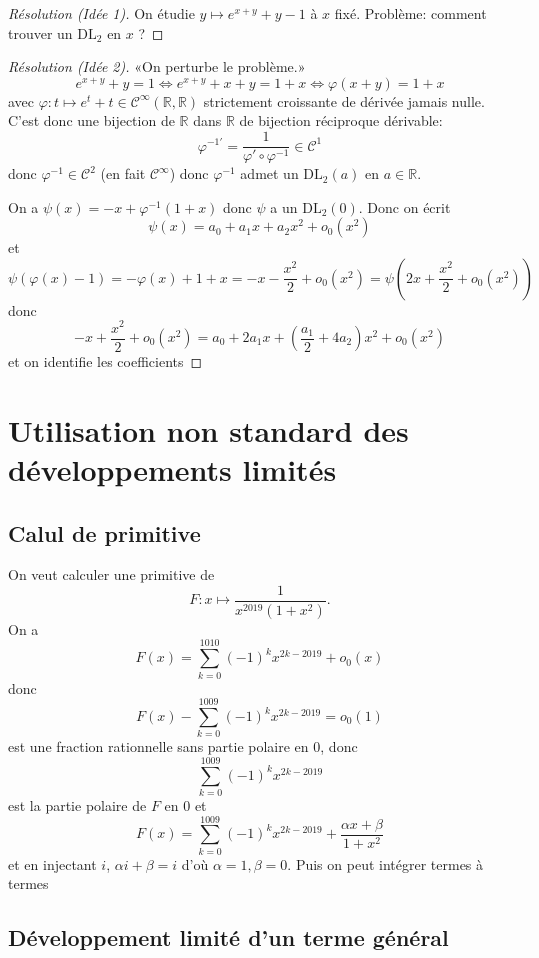 \begin{proof}[Résolution (Idée 1)]
    On étudie $y\longmapsto e^{x+y}+y-1$ à $x$ fixé. Problème: comment trouver un $\mathrm{DL}_2$ en $x$ ?
\end{proof}

\begin{proof}[Résolution (Idée 2)]
    «On perturbe le problème.» \[
        e^{x+y}+y=1\iff e^{x+y}+x+y=1+x \iff \varphi(x+y)=1+x
    \]
    avec $\varphi: t\longmapsto e^t+t\in\mathcal C^{\infty}(\mathbb R, \mathbb R)$ strictement croissante de dérivée jamais nulle. C'est donc une bijection de $\mathbb R$ dans $\mathbb R$ de bijection réciproque dérivable: \[
        \varphi^{-1'}=\frac1{\varphi'\circ \varphi^{-1}}\in\mathcal C^1
    \]
    donc $\varphi^{-1}\in\mathcal C^2$ (en fait $\mathcal C^{\infty}$) donc $\varphi^{-1}$ admet un $\mathrm{DL}_2(a)$ en $a\in\mathbb R$.

    On a $\psi(x)=-x+\varphi^{-1}(1+x)$ donc $\psi$ a un $\mathrm{DL}_2(0)$. Donc on écrit \[
        \psi(x)=a_0+a_1x+a_2x^2+o_0(x^2)
    \]
    et \[\psi(\varphi(x)-1)=-\varphi(x)+1+x=-x-\frac{x^2}2+o_0(x^2)=\psi \left(2x+\frac{x^2}2+o_0(x^2)\right)\]
    donc \[
        -x+\frac{x^2}2+o_0(x^2)=a_0+2a_1x+\left(\frac{a_1}2+4a_2\right)x^2+o_0(x^2)
    \]
    et on identifie les coefficients
\end{proof}

\section{Utilisation non standard des développements limités}

\subsection{Calul de primitive}

On veut calculer une primitive de \[
    F:x\longmapsto \frac1{x^{2019}(1+x^2)}.
\]
On a \[
    F(x)=\sum_{k=0}^{1010}(-1)^kx^{2k-2019}+o_0(x)
\]
donc \[
    F(x)-\sum_{k=0}^{1009}(-1)^kx^{2k-2019}=o_0(1)
\]
est une fraction rationnelle sans partie polaire en $0$, donc \[
    \sum_{k=0}^{1009}(-1)^kx^{2k-2019}
\]
est la partie polaire de $F$ en $0$ et \[
    F(x)=\sum_{k=0}^{1009}(-1)^kx^{2k-2019}+\frac{\alpha x+\beta}{1+x^2}
\]
et en injectant $i$, $\alpha i+\beta=i$ d'où $\alpha=1, \beta=0$. Puis on peut intégrer termes à termes

\subsection{Développement limité d'un terme général}

